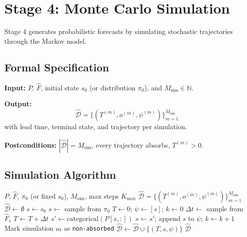 \section{Stage 4: Monte Carlo Simulation}
\label{sec:stage4}

Stage 4 generates probabilistic forecasts by simulating stochastic
trajectories through the Markov model.

\subsection{Formal Specification}
\label{sec:s4-formal}

\begin{definition}
\label{def:contract-s4}
\textbf{Input:} $P$, $\hat{F}$, initial state $s_0$ (or distribution
$\pi_0$), and $M_{\text{sim}} \in \mathbb{N}$.

\textbf{Output:}
\begin{equation}
\label{eq:forecast-distribution}
\hat{\mathcal{D}} = \{(T^{(m)}, o^{(m)}, \psi^{(m)})\}_{m=1}^{M_{\text{sim}}}
\end{equation}
with lead time, terminal state, and trajectory per simulation.

\textbf{Postconditions:} $|\hat{\mathcal{D}}| = M_{\text{sim}}$, every
trajectory absorbs, $T^{(m)} > 0$.
\end{definition}


\subsection{Simulation Algorithm}
\label{sec:s4-algorithm}

\begin{algorithm}[htbp]
\caption{Process-Aware Monte Carlo Simulation}
\label{alg:mc-full}
\begin{algorithmic}[1]
\REQUIRE $P$, $\hat{F}$, $\pi_0$ (or fixed $s_0$), $M_{\text{sim}}$,
    max steps $K_{\max}$
\ENSURE $\hat{\mathcal{D}} = \{(T^{(m)}, o^{(m)}, \psi^{(m)})\}_{m=1}^{M_{\text{sim}}}$
\STATE $\hat{\mathcal{D}} \gets \emptyset$
        \STATE $s \gets s_0$
    \ELSE
        \STATE $s \gets$ sample from $\pi_0$
    \ENDIF
    \STATE $T \gets 0$; $\psi \gets [s]$; $k \gets 0$
        \STATE $\Delta t \gets$ sample from $\hat{F}_s$
        \STATE $T \gets T + \Delta t$
        \STATE $s' \gets \text{categorical}(P[s, :])$
        \STATE $s \gets s'$; append $s$ to $\psi$; $k \gets k + 1$
    \ENDWHILE
        \STATE Mark simulation $m$ as \texttt{non-absorbed}
    \ENDIF
    \STATE $\hat{\mathcal{D}} \gets \hat{\mathcal{D}} \cup \{(T, s, \psi)\}$
\ENDFOR
\RETURN $\hat{\mathcal{D}}$
\end{algorithmic}
\end{algorithm}

